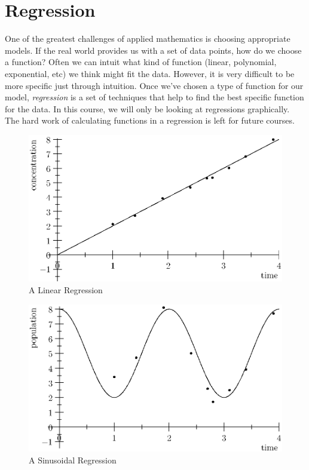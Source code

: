 \documentclass[fleqn]{report}
\begin{document}
\section*{Regression}

One of the greatest challenges of applied mathematics is
choosing appropriate models. If the real world provides us
with a set of data points, how do we choose a function?
Often we can intuit what kind of function (linear, polynomial,
exponential, etc) we think might fit the data. However, it is
very difficult to be more specific just through intuition.
Once we've chosen a type of function for our model,
\emph{regression} is a set of techniques that help to find the
best specific function for the data.  In this course, we will
only be looking at regressions graphically. The hard work of
calculating functions in a regression is left for future
courses. 

\begin{figure}[ht]
\centering
\includegraphics[width=12cm]{figure37.eps}
\caption{A Linear Regression}
\label{A Linear Regression}
\end{figure}

\begin{figure}[ht]
\centering
\includegraphics[width=12cm]{figure38.eps}
\caption{A Sinusoidal Regression}
\label{A Sinusoidal Regression}
\end{figure}
\end{document}
